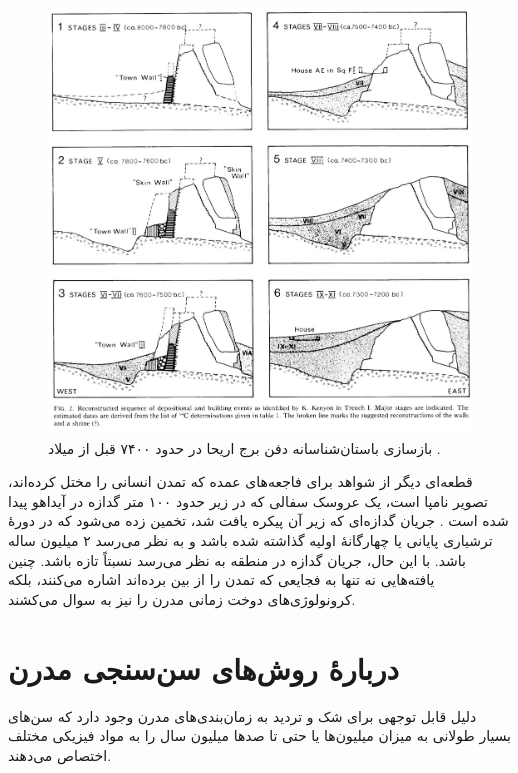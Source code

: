 \documentclass[10pt,twocolumn,letterpaper]{article}
\begin{document}
\begin{figure}[t]
\begin{center}
   \includegraphics[width=1\linewidth]{jericho.jpg}
\end{center}
   \caption{بازسازی باستان‌شناسانه دفن برج اریحا در حدود ۷۴۰۰ قبل از میلاد \cite{95}.}
\label{fig:14}
\label{fig:onecol}
\end{figure}

قطعه‌ای دیگر از شواهد برای فاجعه‌های عمده که تمدن انسانی را مختل کرده‌اند، تصویر نامپا است، یک عروسک سفالی که در زیر حدود ۱۰۰ متر گدازه در آیداهو پیدا شده است \cite{102,103}. جریان گدازه‌ای که زیر آن پیکره یافت شد، تخمین زده می‌شود که در دورهٔ ترشیاری پایانی یا چهارگانهٔ اولیه گذاشته شده باشد و به نظر می‌رسد ۲ میلیون ساله باشد. با این حال، جریان گدازه در منطقه به نظر می‌رسد نسبتاً تازه باشد. چنین یافته‌هایی نه تنها به فجایعی که تمدن را از بین برده‌اند اشاره می‌کنند، بلکه کرونولوژی‌های دوخت زمانی مدرن را نیز به سوال می‌کشند.

\section{دربارهٔ روش‌های سن‌سنجی مدرن}

دلیل قابل توجهی برای شک و تردید به زمان‌بندی‌های مدرن وجود دارد که سن‌های بسیار طولانی به میزان میلیون‌ها یا حتی تا صدها میلیون سال را به مواد فیزیکی مختلف اختصاص می‌دهند.
\end{document}
